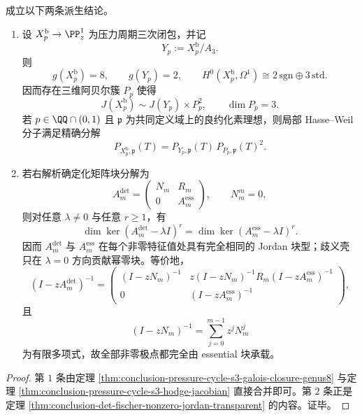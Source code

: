 \begin{theorem}\label{thm:conclusion-prym-square-jordan-zero-shell-exclusive}
成立以下两条派生结论。
\begin{enumerate}
  \item 设 \(X_p^{\mathrm b}\to \PP^1_z\) 为压力周期三次闭包，并记
  \[
  Y_p:=X_p^{\mathrm b}/A_3.
  \]
  则
  \[
  g(X_p^{\mathrm b})=8,
  \qquad
  g(Y_p)=2,
  \qquad
  H^0(X_p^{\mathrm b},\Omega^1)\cong 2\,\mathrm{sgn}\oplus 3\,\mathrm{std}.
  \]
  因而存在三维阿贝尔簇 \(P_p\) 使得
  \[
  J(X_p^{\mathrm b})\sim J(Y_p)\times P_p^2,
  \qquad
  \dim P_p=3.
  \]
  若 \(p\in \QQ\cap(0,1)\) 且 \(\mathfrak p\) 为共同定义域上的良约化素理想，则局部 Hasse--Weil 分子满足精确分解
  \[
  P_{X_p^{\mathrm b},\mathfrak p}(T)
  =
  P_{Y_p,\mathfrak p}(T)\,P_{P_p,\mathfrak p}(T)^2.
  \]

  \item 若右解析确定化矩阵块分解为
  \[
  A_m^{\det}=
  \begin{pmatrix}
  N_m&R_m\\
  0&A_m^{\mathrm{ess}}
  \end{pmatrix},
  \qquad
  N_m^m=0,
  \]
  则对任意 \(\lambda\neq 0\) 与任意 \(r\ge 1\)，有
  \[
  \dim\ker(A_m^{\det}-\lambda I)^r
  =
  \dim\ker(A_m^{\mathrm{ess}}-\lambda I)^r.
  \]
  因而 \(A_m^{\det}\) 与 \(A_m^{\mathrm{ess}}\) 在每个非零特征值处具有完全相同的 Jordan 块型；歧义壳只在 \(\lambda=0\) 方向贡献幂零块。等价地，
  \[
  (I-zA_m^{\det})^{-1}
  =
  \begin{pmatrix}
  (I-zN_m)^{-1} &
  z(I-zN_m)^{-1}R_m(I-zA_m^{\mathrm{ess}})^{-1}\\
  0 &
  (I-zA_m^{\mathrm{ess}})^{-1}
  \end{pmatrix},
  \]
  且
  \[
  (I-zN_m)^{-1}=\sum_{j=0}^{m-1}z^jN_m^j
  \]
  为有限多项式，故全部非零极点都完全由 essential 块承载。
\end{enumerate}
\end{theorem}
\begin{proof}
第 \(1\) 条由定理 \ref{thm:conclusion-pressure-cycle-s3-galois-closure-genus8} 与定理 \ref{thm:conclusion-pressure-cycle-s3-hodge-jacobian} 直接合并即可。第 \(2\) 条正是定理 \ref{thm:conclusion-det-fischer-nonzero-jordan-transparent} 的内容。证毕。
\end{proof}

